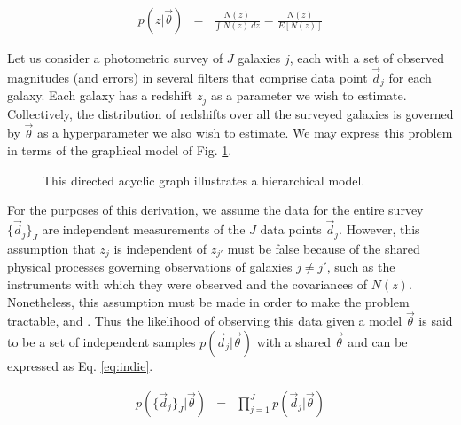 \documentclass[12pt, onecolumn]{emulateapj}
\begin{document}
\begin{eqnarray}
\label{eq:params}
p(z|\vec{\theta}) &=& \frac{N(z)}{\int N(z)\ dz} = \frac{N(z)}{E[N(z)]}
\end{eqnarray}

Let us consider a photometric survey of $J$ galaxies $j$, each with a set of observed magnitudes (and errors) in several filters that comprise data point $\vec{d}_{j}$ for each galaxy.  Each galaxy has a redshift $z_{j}$ as a parameter we wish to estimate.  Collectively, the distribution of redshifts over all the surveyed galaxies is governed by $\vec{\theta}$ as a hyperparameter we also wish to estimate.  We may express this problem in terms of the graphical model of Fig. \ref{fig:flow}.

\begin{figure}
\label{fig:flow}
\vspace{0.5cm}
\begin{center}
\caption{This directed acyclic graph illustrates a hierarchical model.}
\end{center}
\end{figure}

For the purposes of this derivation, we assume the data for the entire survey $\{\vec{d}_{j}\}_{J}$ are independent measurements of the $J$ data points $\vec{d}_{j}$.  However, this assumption that $z_{j}$ is independent of $z_{j'}$ must be false because of the shared physical processes governing observations of galaxies $j\neq j'$, such as the instruments with which they were observed and the covariances of $N(z)$.  Nonetheless, this assumption must be made in order to make the problem tractable, and .  Thus the likelihood of observing this data given a model $\vec{\theta}$ is said to be a set of independent samples $p(\vec{d}_{j}|\vec{\theta})$ with a shared $\vec{\theta}$ and can be expressed as Eq. \ref{eq:indie}.

\begin{eqnarray}
\label{eq:indie}
p(\{\vec{d}_{j}\}_{J}|\vec{\theta}) &=& \prod_{j=1}^{J}p(\vec{d}_{j}|\vec{\theta})
\end{eqnarray}
\end{document}
